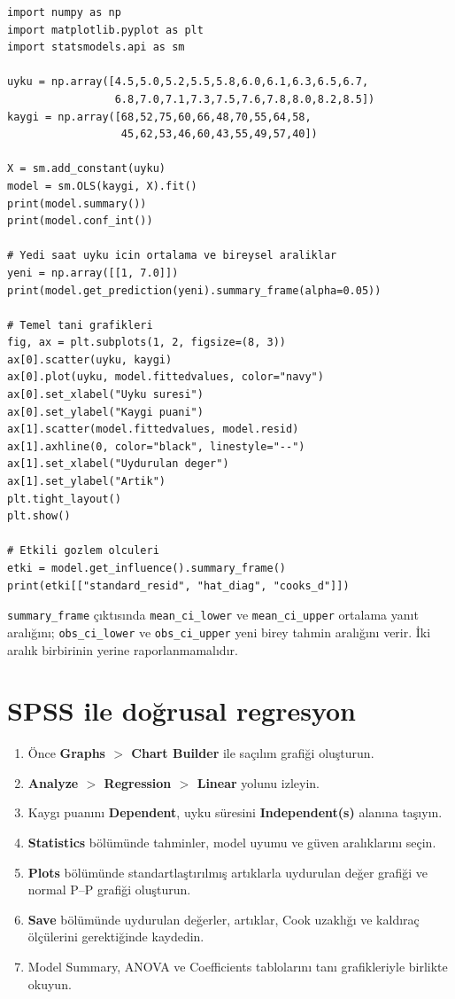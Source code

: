 \begin{lstlisting}
import numpy as np
import matplotlib.pyplot as plt
import statsmodels.api as sm

uyku = np.array([4.5,5.0,5.2,5.5,5.8,6.0,6.1,6.3,6.5,6.7,
                 6.8,7.0,7.1,7.3,7.5,7.6,7.8,8.0,8.2,8.5])
kaygi = np.array([68,52,75,60,66,48,70,55,64,58,
                  45,62,53,46,60,43,55,49,57,40])

X = sm.add_constant(uyku)
model = sm.OLS(kaygi, X).fit()
print(model.summary())
print(model.conf_int())

# Yedi saat uyku icin ortalama ve bireysel araliklar
yeni = np.array([[1, 7.0]])
print(model.get_prediction(yeni).summary_frame(alpha=0.05))

# Temel tani grafikleri
fig, ax = plt.subplots(1, 2, figsize=(8, 3))
ax[0].scatter(uyku, kaygi)
ax[0].plot(uyku, model.fittedvalues, color="navy")
ax[0].set_xlabel("Uyku suresi")
ax[0].set_ylabel("Kaygi puani")
ax[1].scatter(model.fittedvalues, model.resid)
ax[1].axhline(0, color="black", linestyle="--")
ax[1].set_xlabel("Uydurulan deger")
ax[1].set_ylabel("Artik")
plt.tight_layout()
plt.show()

# Etkili gozlem olculeri
etki = model.get_influence().summary_frame()
print(etki[["standard_resid", "hat_diag", "cooks_d"]])
\end{lstlisting}

\texttt{summary\_frame} çıktısında \texttt{mean\_ci\_lower} ve
\texttt{mean\_ci\_upper} ortalama yanıt aralığını;
\texttt{obs\_ci\_lower} ve \texttt{obs\_ci\_upper} yeni birey tahmin
aralığını verir. İki aralık birbirinin yerine raporlanmamalıdır.

\section{SPSS ile doğrusal regresyon}

\begin{enumerate}
  \item Önce \textbf{Graphs $>$ Chart Builder} ile saçılım grafiği oluşturun.
  \item \textbf{Analyze $>$ Regression $>$ Linear} yolunu izleyin.
  \item Kaygı puanını \textbf{Dependent}, uyku süresini \textbf{Independent(s)} alanına taşıyın.
  \item \textbf{Statistics} bölümünde tahminler, model uyumu ve güven aralıklarını seçin.
  \item \textbf{Plots} bölümünde standartlaştırılmış artıklarla uydurulan değer grafiği ve normal P--P grafiği oluşturun.
  \item \textbf{Save} bölümünde uydurulan değerler, artıklar, Cook uzaklığı ve kaldıraç ölçülerini gerektiğinde kaydedin.
  \item Model Summary, ANOVA ve Coefficients tablolarını tanı grafikleriyle birlikte okuyun.
\end{enumerate}


